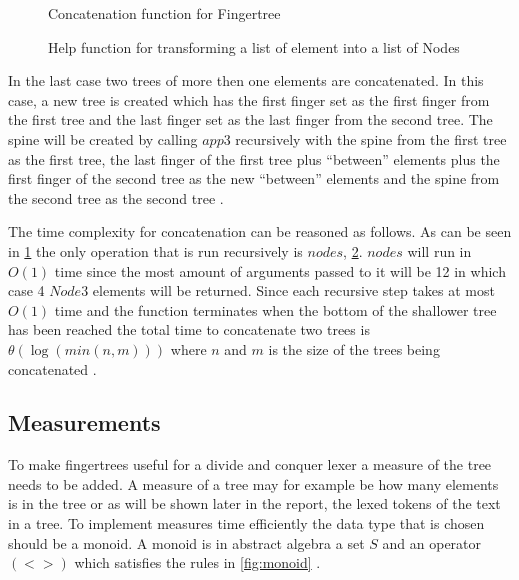 \begin{figure}[h!]


\caption{Concatenation function for Fingertree \label{fig:concat}\cite{fingertree}}
\end{figure}

%

\begin{figure}[h!]

\caption{Help function for transforming a list of element into a list of Nodes
  \label{fig:nodesHelp}\cite{fingertree}}
\end{figure}

In the last case two trees of more then one elements
are concatenated. In this case, a new tree is created which has the first
finger set as the first finger from the first tree and the last finger set as
the last finger from the second tree. The spine will be created by calling
$app3$ recursively with the spine from the first tree as the first tree, the last
finger of the first tree plus ``between'' elements plus the first finger of the
second tree as the new ``between'' elements and the spine from the second tree
as the second tree \cite{fingertree}.

\newpage

The time complexity for concatenation can be reasoned as follows. As can be seen
in \cref{fig:concat} the only operation that is run recursively is $nodes$, \cref{fig:nodesHelp}. $nodes$
will run in $O(1)$ time since the most amount of arguments passed to it will be
12 in which case 4 $Node3$ elements will be returned. Since each recursive step
takes at most $O(1)$ time and the function terminates when the bottom of the
shallower tree has been reached the total time to concatenate two trees is
$\theta(\log(min(n,m)))$ where $n$ and $m$ is the size of the trees being
concatenated \cite{fingertree}.

\subsection{Measurements \label{sub:measurement}}
To make fingertrees useful for a divide and conquer lexer a measure of the tree
needs to be added. A measure of a tree may for example be how many elements is
in the tree or as will be shown later in the report, the lexed tokens of the
text in a tree. To implement measures time efficiently the data type that is
chosen should be a monoid. A monoid is in abstract algebra a set $S$ and an
operator $(<>)$ which satisfies the rules in \cref{fig:monoid} \cite{fingertree}.


